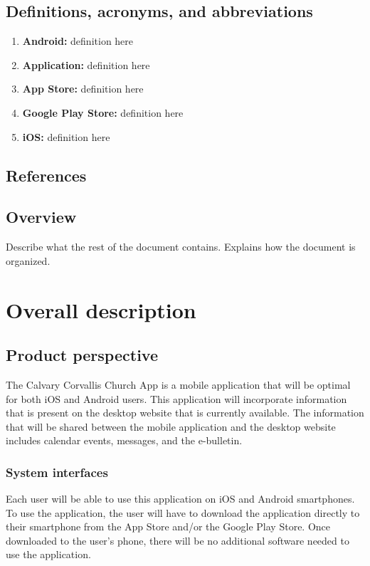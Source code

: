 \documentclass[letterpaper,10pt,draftclsnofoot,onecolumn,titlepage]{IEEEtran}
\begin{document}
	\subsection{Definitions, acronyms, and abbreviations}
	
	\begin{enumerate}
	\item \textbf{Android:} definition here
	\item \textbf{Application:} definition here
	\item \textbf{App Store:} definition here
	\item \textbf{Google Play Store:} definition here
	\item \textbf{iOS:} definition here
	\end{enumerate}
	
	\subsection{References}
	
	\subsection{Overview}
	Describe what the rest of the document contains. 
	Explains how the document is organized. 
	
	\section{Overall description}
	\subsection{Product perspective}
	The Calvary Corvallis Church App is a mobile application that will be optimal for both iOS and Android users. 
	This application will incorporate information that is present on the desktop website that is currently available. 
	The information that will be shared between the mobile application and the desktop website includes calendar events, messages, and the e-bulletin. 
	
	\subsubsection{System interfaces}
	Each user will be able to use this application on iOS and Android smartphones. 
	To use the application, the user will have to download the application directly to their smartphone from the App Store and/or the Google Play Store. 
	Once downloaded to the user's phone, there will be no additional software needed to use the application. 
	
\end{document}
